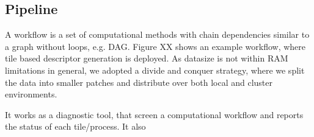 \subsection{Pipeline}
\label{Pipe}
A workflow is a set of computational methods with chain dependencies similar to a graph without loops, e.g. DAG. Figure XX shows an example workflow, where tile based descriptor generation is deployed. As datasize is not within RAM limitations in general, we adopted a divide and conquer strategy, where we split the data into smaller patches and distribute over both local and cluster environments. 

It works as a diagnostic tool, that screen a computational workflow and reports the status of each tile/process. It also 

